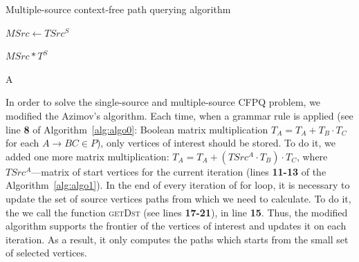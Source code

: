 \begin{algorithm}
\small
\begin{algorithmic}[1]
\caption{Multiple-source context-free path querying algorithm}
\label{alg:algo1}


     
    \EndFor
    
    \State $MSrc \gets TSrc^S$

     
        \EndFor
    \EndFor

     
        \EndFor
    \EndWhile
    \State \Return $MSrc * T^S$
\EndFunction



    \EndFor
    \State \Return A
\EndFunction
\end{algorithmic}
\end{algorithm}

In order to solve the single-source and multiple-source CFPQ problem, we modified the Azimov's algorithm.
Each time, when a grammar rule is applied (see line \textbf{8} of Algorithm~\ref{alg:algo0}: Boolean matrix multiplication $T_A = T_A + T_B \cdot T_C$ for each $A \rightarrow BC \in P$), only vertices of interest should be stored.
To do it, we added one more matrix multiplication: $T_A = T_A + (TSrc^A \cdot T_B) \cdot T_C$, where $TSrc^A$---matrix of start vertices for the current iteration (lines \textbf{11-13} of the Algorithm~\ref{alg:algo1}).
In the end of every iteration of for loop, it is necessary to update the set of source vertices paths from which we need to calculate.
To do it, the we call the function \textsc{getDst} (see lines \textbf{17-21}), in line \textbf{15}.
Thus, the modified algorithm supports the frontier of the vertices of interest and updates it on each iteration.
As a result, it only computes the paths which starts from the small set of selected vertices.

